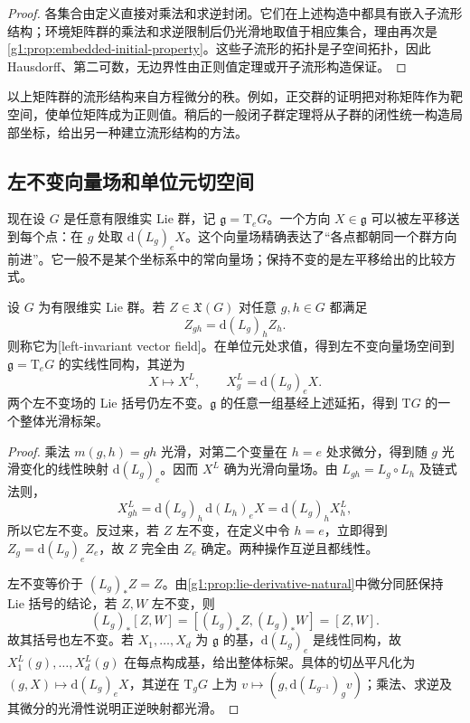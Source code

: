 \begin{proof}
	各集合由定义直接对乘法和求逆封闭。它们在上述构造中都具有嵌入子流形结构；环境矩阵群的乘法和求逆限制后仍光滑地取值于相应集合，理由再次是\cref{g1:prop:embedded-initial-property}。这些子流形的拓扑是子空间拓扑，因此 Hausdorff、第二可数，无边界性由正则值定理或开子流形构造保证。
\end{proof}

以上矩阵群的流形结构来自方程微分的秩。例如，正交群的证明把对称矩阵作为靶空间，使单位矩阵成为正则值。稍后的一般闭子群定理将从子群的闭性统一构造局部坐标，给出另一种建立流形结构的方法。

\subsection{左不变向量场和单位元切空间}
\label{g1:subsec:1601:02}

现在设 \(G\) 是任意有限维实 Lie 群，记 \(\mathfrak g=\mathrm{T}_eG\)。一个方向 \(X\in\mathfrak g\) 可以被左平移送到每个点：在 \(g\) 处取 \(\mathrm{d}(L_g)_eX\)。这个向量场精确表达了“各点都朝同一个群方向前进”。它一般不是某个坐标系中的常向量场；保持不变的是左平移给出的比较方式。

\begin{proposition}\label{g1:prop:left-invariant-fields}
	设 \(G\) 为有限维实 Lie 群。若 \(Z\in\mathfrak X(G)\) 对任意 \(g,h\in G\) 都满足
	\[
		Z_{gh}=\mathrm{d}(L_g)_hZ_h.
	\]
	则称它为[left-invariant vector field]。在单位元处求值，得到左不变向量场空间到 \(\mathfrak g=\mathrm{T}_eG\) 的实线性同构，其逆为
	\begin{equation}\label{g1:eq:left-invariant-extension}
		X\longmapsto X^L,\qquad X^L_g=\mathrm{d}(L_g)_eX.
	\end{equation}
	两个左不变场的 Lie 括号仍左不变。\(\mathfrak g\) 的任意一组基经上述延拓，得到 \(\mathrm{T}G\) 的一个整体光滑标架。
\end{proposition}
\begin{proof}
	乘法 \(m(g,h)=gh\) 光滑，对第二个变量在 \(h=e\) 处求微分，得到随 \(g\) 光滑变化的线性映射 \(\mathrm{d}(L_g)_e\)。因而 \(X^L\) 确为光滑向量场。由 \(L_{gh}=L_g\circ L_h\) 及链式法则，
	\[
		X^L_{gh}=\mathrm{d}(L_g)_h\,\mathrm{d}(L_h)_eX=\mathrm{d}(L_g)_hX^L_h,
	\]
	所以它左不变。反过来，若 \(Z\) 左不变，在定义中令 \(h=e\)，立即得到 \(Z_g=\mathrm{d}(L_g)_eZ_e\)，故 \(Z\) 完全由 \(Z_e\) 确定。两种操作互逆且都线性。

	左不变等价于 \((L_g)_*Z=Z\)。由\cref{g1:prop:lie-derivative-natural}中微分同胚保持 Lie 括号的结论，若 \(Z,W\) 左不变，则
	\[
		(L_g)_*[Z,W]=[(L_g)_*Z,(L_g)_*W]=[Z,W].
	\]
	故其括号也左不变。若 \(X_1,\ldots,X_d\) 为 \(\mathfrak g\) 的基，\(\mathrm{d}(L_g)_e\) 是线性同构，故 \(X_1^L(g),\ldots,X_d^L(g)\) 在每点构成基，给出整体标架。具体的切丛平凡化为 \((g,X)\mapsto\mathrm{d}(L_g)_eX\)，其逆在 \(\mathrm{T}_gG\) 上为 \(v\mapsto(g,\mathrm{d}(L_{g^{-1}})_gv)\)；乘法、求逆及其微分的光滑性说明正逆映射都光滑。
\end{proof}

